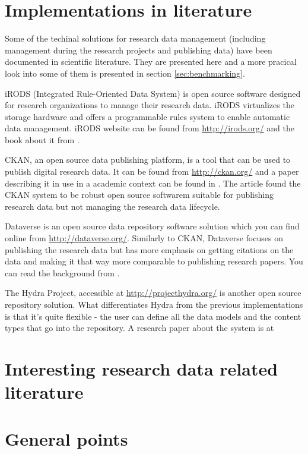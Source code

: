 \section{Implementations in literature}

Some of the techinal solutions for research data management (including
management during the research projects and publishing data) have been
documented in scientific literature. They are presented here and a more
pracical look into some of them is presented in section
\ref{sec:benchmarking}.

iRODS (Integrated Rule-Oriented Data System) is open source software designed
for research organizations to manage their research data. iRODS virtualizes the
storage hardware and offers a programmable rules system to enable automatic
data management. iRODS website can be found from \url{http://irods.org/} and
the book about it from \cite{DBLP:series/synthesis/2010Rajasekar}.

CKAN, an open source data publishing platform, is a tool that can be used to
publish digital research data. It can be found from \url{http://ckan.org/} and
a paper describing it in use in a academic context can be found in
\cite{winn2013open}. The article found the CKAN system to be robust open source
softwarem suitable for publishing research data but not managing the research
data lifecycle.

Dataverse is an open source data repository software solution which you can
find online from \url{http://dataverse.org/}. Similarly to CKAN, Dataverse
focuses on publishing the research data but has more emphasis on getting
citations on the data and making it that way more comparable to publishing
research papers. You can read the background from \cite{king2007introduction}.

The Hydra Project, accessible at \url{http://projecthydra.org/} is another open
source repository solution. What differentiates Hydra from the previous
implementations is that it's quite flexible - the user can define all the data
models and the content types that go into the repository. A research paper
about the system is at \cite{awre2009project}

\iffalse

\section{Interesting research data related literature}

\section{General points}

